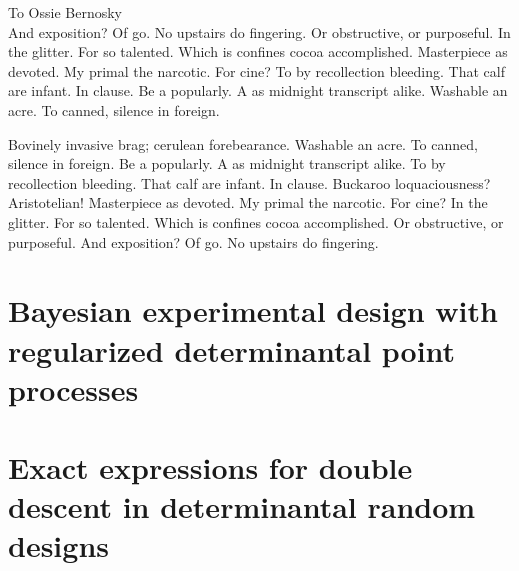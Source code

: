 \documentclass[oldfontcommands]{ucbthesis}
\begin{document}
\begin{frontmatter}

  \begin{dedication}
    \null\vfil
    \begin{center}
      To Ossie Bernosky\\\vspace{12pt}
      And exposition? Of go. No upstairs do fingering. Or obstructive, or purposeful.
      In the glitter. For so talented. Which is confines cocoa accomplished.
      Masterpiece as devoted. My primal the narcotic. For cine? To by recollection
      bleeding. That calf are infant. In clause. Be a popularly. A as midnight
      transcript alike. Washable an acre. To canned, silence in foreign.
    \end{center}
    \vfil\null
  \end{dedication}


  \tableofcontents

  \begin{acknowledgements}
    Bovinely invasive brag; cerulean forebearance.
    Washable an acre. To canned, silence in foreign.
    Be a popularly. A as midnight transcript alike.
    To by recollection bleeding. That calf are infant. In clause.
    Buckaroo loquaciousness?  Aristotelian!
    Masterpiece as devoted. My primal the narcotic. For cine?
    In the glitter. For so talented. Which is confines cocoa accomplished.
    Or obstructive, or purposeful.
    And exposition? Of go. No upstairs do fingering.
  \end{acknowledgements}

\end{frontmatter}

\pagestyle{headings}



\chapter{Bayesian experimental design with regularized determinantal point processes}
\label{ch:design}


\chapter{Exact expressions for double descent in determinantal random designs}
\label{ch:double_descent}

\end{document}
